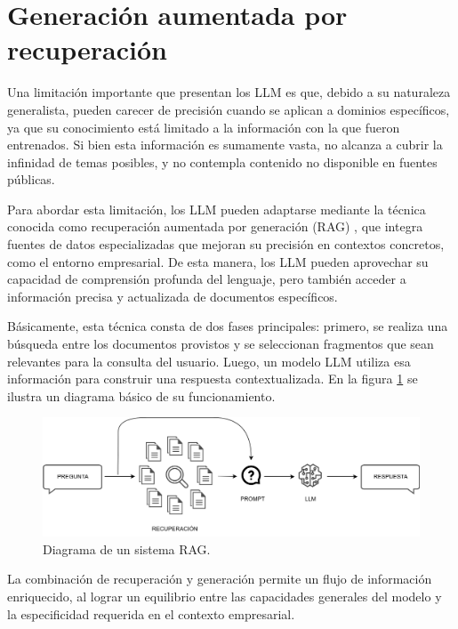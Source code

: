 \section{Generación aumentada por recuperación}

Una limitación importante que presentan los LLM es que, debido a su naturaleza generalista, pueden 
carecer de precisión cuando se aplican a dominios específicos, ya que su conocimiento está limitado a la información 
con la que fueron entrenados. Si bien esta información es sumamente vasta, no alcanza a cubrir la infinidad de temas 
posibles, y no contempla contenido no disponible en fuentes públicas.

Para abordar esta limitación, los LLM pueden adaptarse mediante la técnica conocida como recuperación aumentada por 
generación (RAG) \citep{paper:rag-1}, que integra fuentes de datos especializadas que mejoran su precisión 
en contextos concretos, como el entorno empresarial. De esta manera, los LLM pueden aprovechar su capacidad de 
comprensión profunda del lenguaje, pero también acceder a información precisa y actualizada de documentos específicos.

Básicamente, esta técnica consta de dos fases principales: primero, se realiza una búsqueda entre los documentos
provistos y se seleccionan fragmentos que sean relevantes para la consulta del usuario. Luego, un modelo LLM
utiliza esa información para construir una respuesta contextualizada. En la figura \ref{fig:rag} se ilustra
un diagrama básico de su funcionamiento.

\vspace{3mm}

\begin{figure}[ht]
	\centering
	\includegraphics[scale=.24]{./Figures/rag.png}
	\caption{Diagrama de un sistema RAG.}
	\label{fig:rag}
\end{figure}

La combinación de recuperación y generación permite un flujo de información enriquecido, al lograr un equilibrio 
entre las capacidades generales del modelo y la especificidad requerida en el contexto empresarial.

